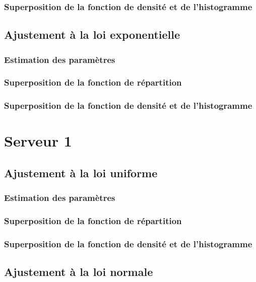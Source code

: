 \documentclass{article}
\begin{document}
\subsubsection{Superposition de la fonction de densité et de l'histogramme}

\subsection {Ajustement à la loi exponentielle}

\subsubsection{Estimation des paramètres}
\subsubsection{Superposition de la fonction de répartition}
\subsubsection{Superposition de la fonction de densité et de l'histogramme}

\section{Serveur 1}

\subsection{Ajustement à la loi uniforme}

\subsubsection{Estimation des paramètres}
\subsubsection{Superposition de la fonction de répartition}
\subsubsection{Superposition de la fonction de densité et de l'histogramme}

\subsection{Ajustement à la loi normale}
\end{document}
